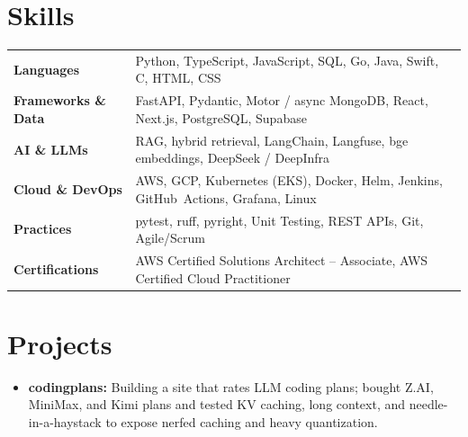 \documentclass[11pt, letterpaper]{article}
\begin{document}
\section{Skills}
\begin{tabularx}{\textwidth}{@{}l @{\hspace{7pt}} >{\raggedright\arraybackslash}X@{}}
  \textbf{Languages} & Python, TypeScript, JavaScript, SQL, Go, Java, Swift, C, HTML, CSS \\[1pt]
  \textbf{Frameworks \& Data} & FastAPI, Pydantic, Motor / async MongoDB, React, Next.js, PostgreSQL, Supabase \\[1pt]
  \textbf{AI \& LLMs} & RAG, hybrid retrieval, LangChain, Langfuse, bge embeddings, DeepSeek / DeepInfra \\[1pt]
  \textbf{Cloud \& DevOps} & AWS, GCP, Kubernetes (EKS), Docker, Helm, Jenkins, GitHub~Actions, Grafana, Linux \\[1pt]
  \textbf{Practices} & pytest, ruff, pyright, Unit Testing, REST APIs, Git, Agile/Scrum \\[1pt]
  \textbf{Certifications} & AWS Certified Solutions Architect -- Associate, AWS Certified Cloud Practitioner \\
\end{tabularx}

\section{Projects}
\begin{itemize}
  \item \textbf{codingplans:} Building a site that rates LLM coding plans; bought Z.AI, MiniMax, and Kimi plans and tested KV caching, long context, and needle-in-a-haystack to expose nerfed caching and heavy quantization.
\end{itemize}
\end{document}
